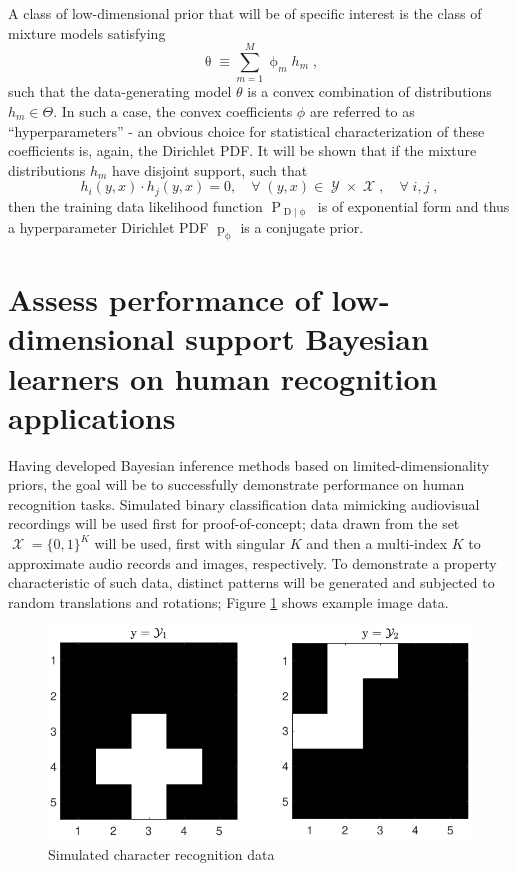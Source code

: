 \documentclass[12pt]{report}
\DeclareMathOperator{\Drm}{\mathrm{D}}
\DeclareMathOperator{\Prm}{\mathrm{P}}
\DeclareMathOperator{\prm}{\mathrm{p}}
\DeclareMathOperator{\Xcal}{\mathcal{X}}
\DeclareMathOperator{\Ycal}{\mathcal{Y}}
\begin{document}
A class of low-dimensional prior that will be of specific interest is the class of mixture models satisfying
\begin{equation}
\uptheta \equiv \sum_{m = 1}^M \upphi_m h_m \;,
\end{equation}
such that the data-generating model $\theta$ is a convex combination of distributions $h_m \in \Theta$. In such a case, the convex coefficients $\phi$ are referred to as ``hyperparameters'' - an obvious choice for statistical characterization of these coefficients is, again, the Dirichlet PDF. It will be shown that if the mixture distributions $h_m$ have disjoint support, such that
\begin{equation}
h_i(y,x) \cdot h_j(y,x) = 0, \quad \forall \; (y,x) \in \Ycal \times \Xcal, \quad \forall \; i,j \;,
\end{equation}
then the training data likelihood function $\Prm_{\Drm | \upphi}$ is of exponential form and thus a hyperparameter Dirichlet PDF $\prm_{\upphi}$ is a conjugate prior.






\section{Assess performance of low-dimensional support Bayesian learners on human recognition applications}

Having developed Bayesian inference methods based on limited-dimensionality priors, the goal will be to successfully demonstrate performance on human recognition tasks. Simulated binary classification data mimicking audiovisual recordings will be used first for proof-of-concept; data drawn from the set $\Xcal = \{0,1\}^K$ will be used, first with singular $K$ and then a multi-index $K$ to approximate audio records and images, respectively. To demonstrate a property characteristic of such data, distinct patterns will be generated and subjected to random translations and rotations; Figure \ref{fig:character_sim_ex} shows example image data.
\begin{figure}
\centering
\includegraphics[width=0.8\linewidth]{character_sim_ex.pdf}
\caption{Simulated character recognition data}
\label{fig:character_sim_ex}
\end{figure}
\end{document}
